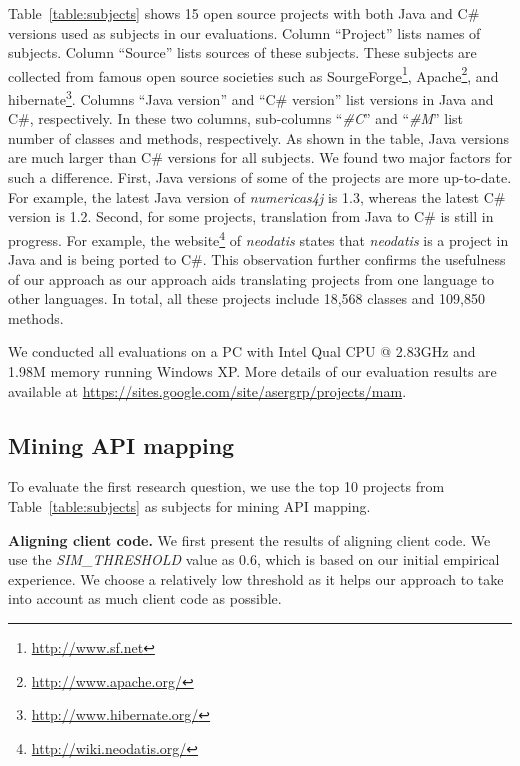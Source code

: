 Table~\ref{table:subjects} shows 15 open source projects with both Java and
C\# versions used as subjects in our evaluations.
Column ``Project'' lists names of subjects. Column ``Source'' lists sources of these
subjects. These subjects are collected from famous open source societies such
as SourgeForge\footnote{\url{http://www.sf.net}},
Apache\footnote{\url{http://www.apache.org/}}, and
hibernate\footnote{\url{http://www.hibernate.org/}}. Columns ``Java
version'' and ``C\# version'' list versions in Java and
C\#, respectively. In these two columns, sub-columns
``\emph{\#C}'' and ``\emph{\#M}'' list number of classes and methods, respectively. As shown
in the table, Java versions are much larger than C\# versions
for all subjects. We found two major factors for such
a difference. First, Java versions of some of the
projects are more up-to-date. For example, the latest Java
version of \emph{numericas4j} is 1.3, whereas the latest C\# version
is 1.2. Second, for some projects, translation from Java to C\# is still in
progress. For example, the
website\footnote{\url{http://wiki.neodatis.org/}} of \emph{neodatis}
states that \emph{neodatis} is a project in Java and is being ported
to C\#. This observation further confirms the usefulness of our
approach as our approach aids translating projects from one language to other
languages. In total, all these projects include 18,568 classes and 109,850
methods.

We conducted all evaluations on a PC with Intel Qual CPU @
2.83GHz and 1.98M memory running Windows XP. More details of our
evaluation results are available at \url{https://sites.google.com/site/asergrp/projects/mam}.

\subsection{Mining API mapping}
\label{sec:evaluation:mining}

To evaluate the first research question, we use the top 10 projects
from Table~\ref{table:subjects} as subjects for mining API mapping.

\textbf{Aligning client code.}
We first present the results of aligning client code.
We use the \emph{SIM\_THRESHOLD} value as 0.6, which is based on our initial
empirical experience. We choose a relatively low threshold as it helps our
approach to take into account as much client code as possible.

